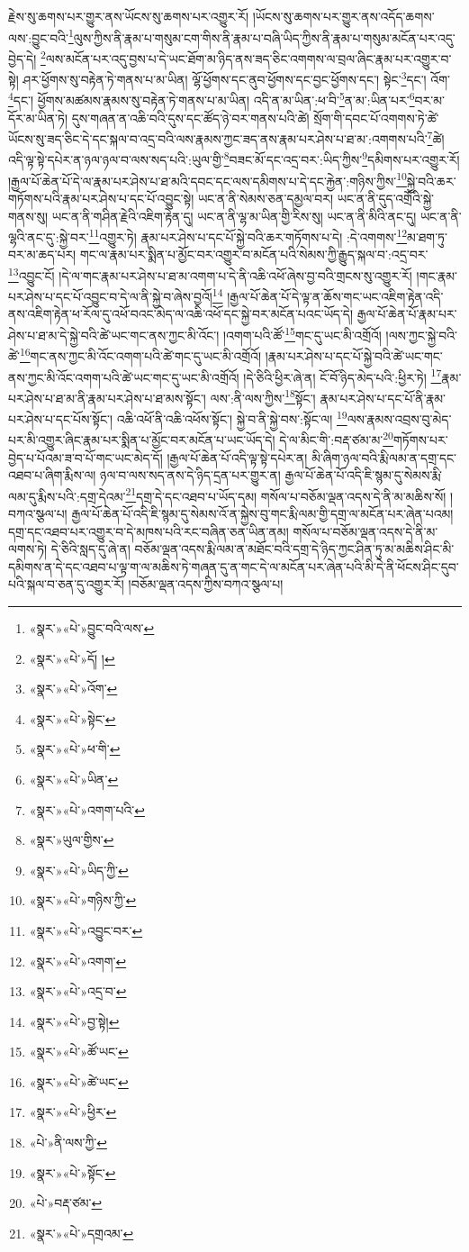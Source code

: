 རྗེས་སུ་ཆགས་པར་གྱུར་ནས་ཡོངས་སུ་ཆགས་པར་འགྱུར་རོ། །ཡོངས་སུ་ཆགས་པར་གྱུར་ནས་འདོད་ཆགས་ལས་:བྱུང་བའི་\footnote{«སྣར་»«པེ་»བྱུང་བའི་ལས་}ལུས་ཀྱིས་ནི་རྣམ་པ་གསུམ་ངག་གིས་ནི་རྣམ་པ་བཞི་ཡིད་ཀྱིས་ནི་རྣམ་པ་གསུམ་མངོན་པར་འདུ་བྱེད་དེ། \footnote{«སྣར་»«པེ་»དོ། ། }ལས་མངོན་པར་འདུ་བྱས་པ་དེ་ཡང་ཐོག་མ་ཉིད་ནས་ཟད་ཅིང་འགགས་ལ་བྲལ་ཞིང་རྣམ་པར་འགྱུར་བ་སྟེ། ཤར་ཕྱོགས་སུ་བརྟེན་ཏེ་གནས་པ་མ་ཡིན། ལྷོ་ཕྱོགས་དང་ནུབ་ཕྱོགས་དང་བྱང་ཕྱོགས་དང་། སྟེང་\footnote{«སྣར་»«པེ་»འོག་}དང་། འོག་\footnote{«སྣར་»«པེ་»སྟེང་}དང་། ཕྱོགས་མཚམས་རྣམས་སུ་བརྟེན་ཏེ་གནས་པ་མ་ཡིན། འདི་ན་མ་ཡིན་:ཕ་བི་\footnote{«སྣར་»«པེ་»ཕ་གི་}ན་མ་:ཡིན་པར་\footnote{«སྣར་»«པེ་»ཡིན་}བར་མ་དོར་མ་ཡིན་ཏེ། དུས་གཞན་ན་འཆི་བའི་དུས་དང་ཚོད་ཉེ་བར་གནས་པའི་ཚེ། སྲོག་གི་དབང་པོ་འགགས་ཏེ་ཚེ་ཡོངས་སུ་ཟད་ཅིང་དེ་དང་སྐལ་བ་འདྲ་བའི་ལས་རྣམས་ཀྱང་ཟད་ནས་རྣམ་པར་ཤེས་པ་ཐ་མ་:འགགས་པའི་\footnote{«སྣར་»«པེ་»འགག་པའི་}ཚེ། འདི་ལྟ་སྟེ་དཔེར་ན་ཉལ་ཉལ་བ་ལས་སད་པའི་:ཡུལ་གྱི་\footnote{«སྣར་»ཡུལ་གྱིས་}བཟང་མོ་དང་འདྲ་བར་:ཡིད་ཀྱིས་\footnote{«སྣར་»«པེ་»ཡིད་ཀྱི་}དམིགས་པར་འགྱུར་རོ། །རྒྱལ་པོ་ཆེན་པོ་དེ་ལ་རྣམ་པར་ཤེས་པ་ཐ་མའི་དབང་དང་ལས་དམིགས་པ་དེ་དང་རྐྱེན་:གཉིས་ཀྱིས་\footnote{«སྣར་»«པེ་»གཉིས་ཀྱི་}སྐྱེ་བའི་ཆར་གཏོགས་པའི་རྣམ་པར་ཤེས་པ་དང་པོ་འབྱུང་སྟེ། ཡང་ན་ནི་སེམས་ཅན་དམྱལ་བར། ཡང་ན་ནི་དུད་འགྲོའི་སྐྱེ་གནས་སུ། ཡང་ན་ནི་གཤིན་རྗེའི་འཇིག་རྟེན་དུ། ཡང་ན་ནི་ལྷ་མ་ཡིན་གྱི་རིས་སུ། ཡང་ན་ནི་མིའི་ནང་དུ། ཡང་ན་ནི་ལྷའི་ནང་དུ་:སྐྱེ་བར་\footnote{«སྣར་»«པེ་»འབྱུང་བར་}འགྱུར་ཏེ། རྣམ་པར་ཤེས་པ་དང་པོ་སྐྱེ་བའི་ཆར་གཏོགས་པ་དེ། :དེ་འགགས་\footnote{«སྣར་»«པེ་»འགག་}མ་ཐག་ཏུ་བར་མ་ཆད་པར། གང་ལ་རྣམ་པར་སྨིན་པ་མྱོང་བར་འགྱུར་བ་མངོན་པའི་སེམས་ཀྱི་རྒྱུད་སྐལ་བ་:འདྲ་བར་\footnote{«སྣར་»«པེ་»འདྲ་བ་}འབྱུང་ངོ། །དེ་ལ་གང་རྣམ་པར་ཤེས་པ་ཐ་མ་འགག་པ་དེ་ནི་འཆི་འཕོ་ཞེས་བྱ་བའི་གྲངས་སུ་འགྱུར་རོ། །གང་རྣམ་པར་ཤེས་པ་དང་པོ་འབྱུང་བ་དེ་ལ་ནི་སྐྱེ་བ་ཞེས་བྱའོ།\footnote{«སྣར་»«པེ་»བྱ་སྟེ།} །རྒྱལ་པོ་ཆེན་པོ་དེ་ལྟ་ན་ཆོས་གང་ཡང་འཇིག་རྟེན་འདི་ནས་འཇིག་རྟེན་ཕ་རོལ་དུ་འཕོ་བའང་མེད་ལ་འཆི་འཕོ་དང་སྐྱེ་བར་མངོན་པའང་ཡོད་དེ། རྒྱལ་པོ་ཆེན་པོ་རྣམ་པར་ཤེས་པ་ཐ་མ་དེ་སྐྱེ་བའི་ཚེ་ཡང་གང་ནས་ཀྱང་མི་འོང་། །འགག་པའི་ཚོ་\footnote{«སྣར་»«པེ་»ཚོ་ཡང་}གང་དུ་ཡང་མི་འགྲོའོ། །ལས་ཀྱང་སྐྱེ་བའི་ཚེ་\footnote{«སྣར་»«པེ་»ཚེ་ཡང་}གང་ནས་ཀྱང་མི་འོང་འགག་པའི་ཚེ་གང་དུ་ཡང་མི་འགྲོའོ། །རྣམ་པར་ཤེས་པ་དང་པོ་སྐྱེ་བའི་ཚེ་ཡང་གང་ནས་ཀྱང་མི་འོང་འགག་པའི་ཚེ་ཡང་གང་དུ་ཡང་མི་འགྲོའོ། །དེ་ཅིའི་ཕྱིར་ཞེ་ན། ངོ་བོ་ཉིད་མེད་པའི་:ཕྱིར་ཏེ། \footnote{«སྣར་»«པེ་»ཕྱིར་}རྣམ་པར་ཤེས་པ་ཐ་མ་ནི་རྣམ་པར་ཤེས་པ་ཐ་མས་སྟོང་། ལས་:ནི་ལས་ཀྱིས་\footnote{«པེ་»ནི་ལས་ཀྱི་}སྟོང་། རྣམ་པར་ཤེས་པ་དང་པོ་ནི་རྣམ་པར་ཤེས་པ་དང་པོས་སྟོང་། འཆི་འཕོ་ནི་འཆི་འཕོས་སྟོང་། སྐྱེ་བ་ནི་སྐྱེ་བས་:སྟོང་ལ། \footnote{«སྣར་»«པེ་»སྟོང་}ལས་རྣམས་འབྲས་བུ་མེད་པར་མི་འགྱུར་ཞིང་རྣམ་པར་སྨིན་པ་མྱོང་བར་མངོན་པ་ཡང་ཡོད་དེ། དེ་ལ་མིང་གི་:བརྡ་ཙམ་མ་\footnote{«པེ་»བརྡ་ཙམ་}གཏོགས་པར་བྱེད་པ་པོའམ་ཟ་བ་པོ་གང་ཡང་མེད་དོ། །རྒྱལ་པོ་ཆེན་པོ་འདི་ལྟ་སྟེ་དཔེར་ན། མི་ཞིག་ཉལ་བའི་རྨི་ལམ་ན་དགྲ་དང་འཐབ་པ་ཞིག་རྨིས་ལ། ཉལ་བ་ལས་སད་ནས་དེ་ཉིད་དྲན་པར་གྱུར་ན། རྒྱལ་པོ་ཆེན་པོ་འདི་ཇི་སྙམ་དུ་སེམས་རྨི་ལམ་དུ་རྨིས་པའི་:དགྲ་དེའམ་\footnote{«སྣར་»«པེ་»དགྲའམ་}དགྲ་དེ་དང་འཐབ་པ་ཡོད་དམ། གསོལ་པ་བཅོམ་ལྡན་འདས་དེ་ནི་མ་མཆིས་སོ། །བཀའ་སྩལ་པ། རྒྱལ་པོ་ཆེན་པོ་འདི་ཇི་སྙམ་དུ་སེམས་འོ་ན་སྐྱེས་བུ་གང་རྨི་ལམ་གྱི་དགྲ་ལ་མངོན་པར་ཞེན་པའམ། དགྲ་དང་འཐབ་པར་འགྱུར་བ་དེ་མཁས་པའི་རང་བཞིན་ཅན་ཡིན་ནམ། གསོལ་པ་བཅོམ་ལྡན་འདས་དེ་ནི་མ་ལགས་ཏེ། དེ་ཅིའི་སླད་དུ་ཞེ་ན། བཅོམ་ལྡན་འདས་རྨི་ལམ་ན་མཐོང་བའི་དགྲ་དེ་ཉིད་ཀྱང་ཤིན་ཏུ་མ་མཆིས་ཤིང་མི་དམིགས་ན་དེ་དང་འཐབ་པ་ལྟ་ག་ལ་མཆིས་ཏེ་གཞན་དུ་ན་གང་དེ་ལ་མངོན་པར་ཞེན་པའི་མི་དེ་ནི་ཕོངས་ཤིང་དུབ་པའི་སྐལ་བ་ཅན་དུ་འགྱུར་རོ། །བཅོམ་ལྡན་འདས་ཀྱིས་བཀའ་སྩལ་པ། 